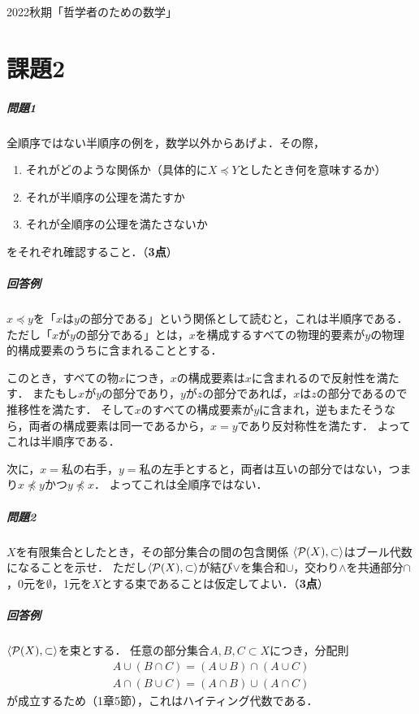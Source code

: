 \documentclass[11pt,a4paper]{jsarticle}
\begin{document}
\noindent
2022秋期「哲学者のための数学」

\section*{課題2}

\subparagraph{問題1}

全順序ではない半順序の例を，数学以外からあげよ．その際，
\begin{enumerate}
 \item それがどのような関係か（具体的に$X \preceq Y$としたとき何を意味するか）
 \item それが半順序の公理を満たすか
 \item それが全順序の公理を満たさないか
\end{enumerate}
をそれぞれ確認すること．（\textbf{3点}）

\subparagraph{回答例}
$x \preceq y$を「$x$は$y$の部分である」という関係として読むと，これは半順序である．
ただし「$x$が$y$の部分である」とは，$x$を構成するすべての物理的要素が$y$の物理的構成要素のうちに含まれることとする．

このとき，すべての物$x$につき，$x$の構成要素は$x$に含まれるので反射性を満たす．
またもし$x$が$y$の部分であり，$y$が$z$の部分であれば，$x$は$z$の部分であるので推移性を満たす．
そして$x$のすべての構成要素が$y$に含まれ，逆もまたそうなら，両者の構成要素は同一であるから，$x=y$であり反対称性を満たす．
よってこれは半順序である．

次に，$x=$私の右手，$y=$私の左手とすると，両者は互いの部分ではない，つまり$x \not\preceq y$かつ$y \not\preceq x$．
よってこれは全順序ではない．




\subparagraph{問題2}
$X$を有限集合としたとき，その部分集合の間の包含関係 $\langle \mathcal{P}(X), \subset \rangle$はブール代数になることを示せ．
ただし$\langle \mathcal{P}(X), \subset \rangle$が結び$\vee$を集合和$\cup$，交わり$\wedge$を共通部分$\cap$，0元を$\emptyset$，1元を$X$とする束であることは仮定してよい．（\textbf{3点}）


\subparagraph{回答例}
$\langle \mathcal{P}(X), \subset \rangle$を束とする．
任意の部分集合$A, B, C \subset X$につき，分配則
\begin{align*}
 A \cup (B \cap C) = (A \cup B) \cap (A \cup C) \\
 A \cap (B \cup C) = (A \cap B) \cup (A \cap C) 
\end{align*}
が成立するため（1章5節），これはハイティング代数である．
\end{document}
